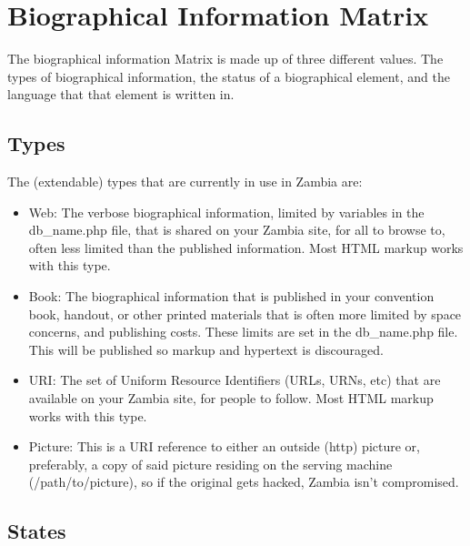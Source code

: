 \documentclass[tablesignature]{scrartcl}
\begin{document}
\section{Biographical Information Matrix}
\label{sec-2}


  The biographical information Matrix is made up of three different
  values.  The types of biographical information, the status of a
  biographical element, and the language that that element is written
  in.
\subsection{Types}
\label{sec-2_1}


   The (extendable) types that are currently in use in Zambia are:
\begin{itemize}
\item Web: The verbose biographical information, limited by variables
     in the db\_{}name.php file, that is shared on your Zambia site, for
     all to browse to, often less limited than the published
     information.  Most HTML markup works with this type.
\item Book: The biographical information that is published in your
     convention book, handout, or other printed materials that is
     often more limited by space concerns, and publishing costs.
     These limits are set in the db\_{}name.php file.  This will be
     published so markup and hypertext is discouraged.
\item URI: The set of Uniform Resource Identifiers (URLs, URNs, etc)
     that are available on your Zambia site, for people to follow.
     Most HTML markup works with this type.
\item Picture: This is a URI reference to either an outside (http)
     picture or, preferably, a copy of said picture residing on the
     serving machine (/path/to/picture), so if the original gets
     hacked, Zambia isn't compromised.
\end{itemize}
\subsection{States}
\label{sec-2_2}
\end{document}

